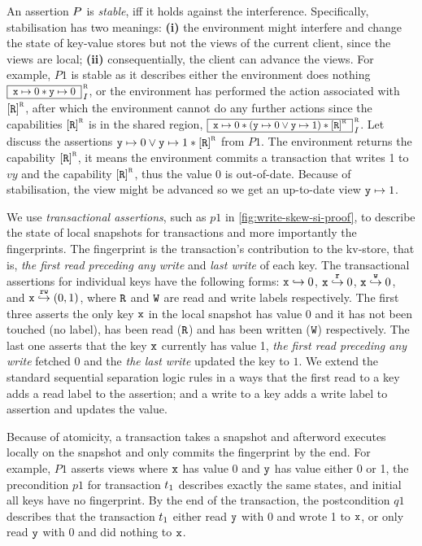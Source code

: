 An assertion \( P \) is \emph{stable}, iff it holds against the interference.
Specifically, stabilisation has two meanings: \textbf{(i)} the environment might interfere and change the state of key-value stores but not the views of the current client, since the views are local; 
\textbf{(ii)} consequentially, the client can advance the views.
For example, \( P1 \) is stable as it describes either the environment does nothing \( \boxass{\vx \pt 0 \sep \vy \pt 0 }{\lrid}{\intass} \),
or the environment has performed the action associated with \( \cass{\CB{R}}{\lrid}\), 
after which the environment cannot do any further actions since the capabilities \( \cass{\CB{R}}{\lrid}\) is in the shared region,
\ie \( \boxass{\vx \pt 0 \sep ( \vy \pt 0 \lor \vy \pt 1 ) \sep \cass{\CB{R}}{\lrid} }{\lrid}{\intass}  \).
Let discuss the assertions \( \vy \pt 0  \lor \vy \pt 1  \sep \cass{\CB{R}}{\lrid} \) from \( P1 \).
The environment returns the capability \( \cass{\CB{R}}{\lrid} \), it means the environment commits a transaction that writes 1 to \( vy \) and the capability \( \cass{\CB{R}}{\lrid} \), thus the value \( 0 \) is out-of-date.
Because of stabilisation, the view might be advanced so we get an up-to-date view \( \texttt{y} \mapsto 1 \).

We use \emph{transactional assertions}, such as \( p1 \) in \cref{fig:write-skew-si-proof}, to describe the state of local snapshots for transactions and more importantly the fingerprints.
The fingerprint is the transaction's contribution to the kv-store, that is, \emph{the first read preceding any write} and \emph{last write} of each key.
The transactional assertions for individual keys have the following forms: \( \texttt{x} \hookrightarrow 0 \), \( \texttt{x} \stackrel{\texttt{r}}{\hookrightarrow} 0\), \( \texttt{x} \stackrel{\texttt{w}}{\hookrightarrow} 0\), and \( \texttt{x} \stackrel{\texttt{rw}}{\hookrightarrow} (0,1) \), where \( \texttt{R} \) and \( \texttt{W} \) are read and write labels respectively.
The first three asserts the only key \( \texttt{x} \) in the local snapshot has value 0 and it has not been touched (no label), has been read (\(\texttt{R}\)) and has been written (\(\texttt{W}\)) respectively.
The last one asserts that the key \( \texttt{x} \) currently has value 1, \emph{the first read preceding any write} fetched 0 and the \emph{the last write} updated the key to \( 1 \).
We extend the standard sequential separation logic rules in a ways that the first read to a key adds a read label to the assertion; and a write to a key adds a write label to assertion and updates the value.

Because of atomicity, a transaction takes a snapshot and afterword executes locally on the snapshot and only commits the fingerprint by the end.
For example, \( P1 \) asserts views where \( \texttt{x} \) has value 0 and \( \texttt{y} \) has value either 0 or 1, the precondition \( p1 \) for transaction \( t_1 \) describes exactly the same states, and initial all keys have no fingerprint.
By the end of the transaction, the postcondition \( q1 \) describes that the transaction \( t_1 \) either read \( \texttt{y} \) with 0 and wrote 1 to \( \texttt{x} \),
or only read \( \texttt{y} \) with 0 and did nothing to \( \texttt{x} \).

